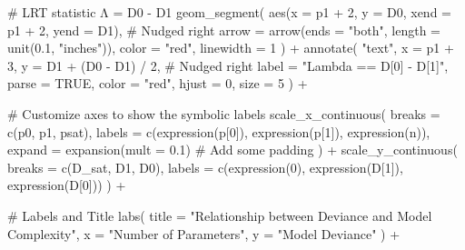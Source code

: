 \documentclass[
  letterpaper,
]{scrbook}
\newenvironment{Shaded}{\begin{snugshade}}{\end{snugshade}}
\newcommand{\AttributeTok}[1]{\textcolor[rgb]{0.40,0.45,0.13}{#1}}
\newcommand{\CommentTok}[1]{\textcolor[rgb]{0.37,0.37,0.37}{#1}}
\newcommand{\ConstantTok}[1]{\textcolor[rgb]{0.56,0.35,0.01}{#1}}
\newcommand{\DecValTok}[1]{\textcolor[rgb]{0.68,0.00,0.00}{#1}}
\newcommand{\FloatTok}[1]{\textcolor[rgb]{0.68,0.00,0.00}{#1}}
\newcommand{\FunctionTok}[1]{\textcolor[rgb]{0.28,0.35,0.67}{#1}}
\newcommand{\NormalTok}[1]{\textcolor[rgb]{0.00,0.23,0.31}{#1}}
\newcommand{\SpecialCharTok}[1]{\textcolor[rgb]{0.37,0.37,0.37}{#1}}
\newcommand{\StringTok}[1]{\textcolor[rgb]{0.13,0.47,0.30}{#1}}
\begin{document}
\begin{Shaded}
\begin{Highlighting}[]
  \CommentTok{\# LRT statistic Λ = D0 {-} D1}
  \FunctionTok{geom\_segment}\NormalTok{(}
    \FunctionTok{aes}\NormalTok{(}\AttributeTok{x =}\NormalTok{ p1 }\SpecialCharTok{+} \DecValTok{2}\NormalTok{, }\AttributeTok{y =}\NormalTok{ D0, }\AttributeTok{xend =}\NormalTok{ p1 }\SpecialCharTok{+} \DecValTok{2}\NormalTok{, }\AttributeTok{yend =}\NormalTok{ D1), }\CommentTok{\# Nudged right}
    \AttributeTok{arrow =} \FunctionTok{arrow}\NormalTok{(}\AttributeTok{ends =} \StringTok{"both"}\NormalTok{, }\AttributeTok{length =} \FunctionTok{unit}\NormalTok{(}\FloatTok{0.1}\NormalTok{, }\StringTok{"inches"}\NormalTok{)),}
    \AttributeTok{color =} \StringTok{"red"}\NormalTok{,}
    \AttributeTok{linewidth =} \DecValTok{1}
\NormalTok{  ) }\SpecialCharTok{+}
  \FunctionTok{annotate}\NormalTok{(}
    \StringTok{"text"}\NormalTok{,}
    \AttributeTok{x =}\NormalTok{ p1 }\SpecialCharTok{+} \DecValTok{3}\NormalTok{, }\AttributeTok{y =}\NormalTok{ D1 }\SpecialCharTok{+}\NormalTok{ (D0 }\SpecialCharTok{{-}}\NormalTok{ D1) }\SpecialCharTok{/} \DecValTok{2}\NormalTok{, }\CommentTok{\# Nudged right}
    \AttributeTok{label =} \StringTok{"Lambda == D[0] {-} D[1]"}\NormalTok{,}
    \AttributeTok{parse =} \ConstantTok{TRUE}\NormalTok{,}
    \AttributeTok{color =} \StringTok{"red"}\NormalTok{, }\AttributeTok{hjust =} \DecValTok{0}\NormalTok{, }\AttributeTok{size =} \DecValTok{5}
\NormalTok{  ) }\SpecialCharTok{+}
  
  \CommentTok{\# Customize axes to show the symbolic labels}
  \FunctionTok{scale\_x\_continuous}\NormalTok{(}
    \AttributeTok{breaks =} \FunctionTok{c}\NormalTok{(p0, p1, psat),}
    \AttributeTok{labels =} \FunctionTok{c}\NormalTok{(}\FunctionTok{expression}\NormalTok{(p[}\DecValTok{0}\NormalTok{]), }\FunctionTok{expression}\NormalTok{(p[}\DecValTok{1}\NormalTok{]), }\FunctionTok{expression}\NormalTok{(n)),}
    \AttributeTok{expand =} \FunctionTok{expansion}\NormalTok{(}\AttributeTok{mult =} \FloatTok{0.1}\NormalTok{) }\CommentTok{\# Add some padding}
\NormalTok{  ) }\SpecialCharTok{+}
  \FunctionTok{scale\_y\_continuous}\NormalTok{(}
    \AttributeTok{breaks =} \FunctionTok{c}\NormalTok{(D\_sat, D1, D0),}
    \AttributeTok{labels =} \FunctionTok{c}\NormalTok{(}\FunctionTok{expression}\NormalTok{(}\DecValTok{0}\NormalTok{), }\FunctionTok{expression}\NormalTok{(D[}\DecValTok{1}\NormalTok{]), }\FunctionTok{expression}\NormalTok{(D[}\DecValTok{0}\NormalTok{]))}
\NormalTok{  ) }\SpecialCharTok{+}
  
  \CommentTok{\# Labels and Title}
  \FunctionTok{labs}\NormalTok{(}
    \AttributeTok{title =} \StringTok{"Relationship between Deviance and Model Complexity"}\NormalTok{,}
    \AttributeTok{x =} \StringTok{"Number of Parameters"}\NormalTok{,}
    \AttributeTok{y =} \StringTok{"Model Deviance"}
\NormalTok{  ) }\SpecialCharTok{+}
  

\end{Highlighting}
\end{Shaded}
\end{document}
